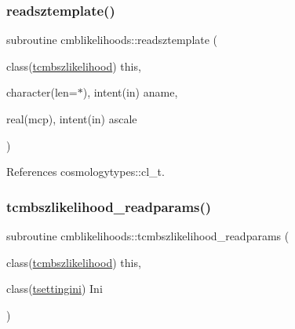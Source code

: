 \subsubsection{\texorpdfstring{readsztemplate()}{readsztemplate()}}
{\footnotesize\ttfamily subroutine cmblikelihoods\+::readsztemplate (\begin{DoxyParamCaption}\item[{class(\mbox{\hyperlink{structcmblikelihoods_1_1tcmbszlikelihood}{tcmbszlikelihood}})}]{this,  }\item[{character(len=$\ast$), intent(in)}]{aname,  }\item[{real(mcp), intent(in)}]{ascale }\end{DoxyParamCaption})\hspace{0.3cm}{\ttfamily [private]}}



References cosmologytypes\+::cl\+\_\+t.

\mbox{\label{namespacecmblikelihoods_ae775cfc1ab138a93684346c644269110}} 
\subsubsection{\texorpdfstring{tcmbszlikelihood\+\_\+readparams()}{tcmbszlikelihood\_readparams()}}
{\footnotesize\ttfamily subroutine cmblikelihoods\+::tcmbszlikelihood\+\_\+readparams (\begin{DoxyParamCaption}\item[{class(\mbox{\hyperlink{structcmblikelihoods_1_1tcmbszlikelihood}{tcmbszlikelihood}})}]{this,  }\item[{class(\mbox{\hyperlink{structsettings_1_1tsettingini}{tsettingini}})}]{Ini }\end{DoxyParamCaption})}

\mbox{\label{namespacecmblikelihoods_a7c01807a08609a029a41a11b39ade069}} 

